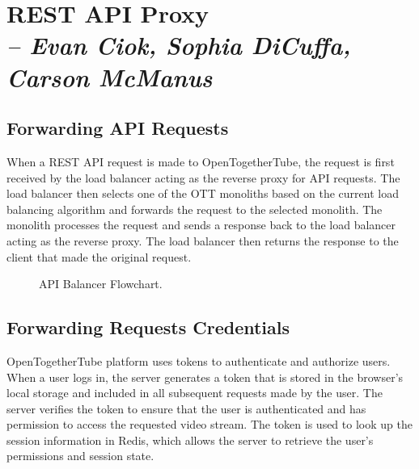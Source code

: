 \chapter{REST API Proxy \\
  \small{\textit{-- Evan Ciok, Sophia DiCuffa, Carson McManus}}
  \label{Chapter::RestApiProxy}}

\section{Forwarding API Requests}
When a REST API request is made to OpenTogetherTube, the request is first received by the load balancer
 acting as the reverse proxy for API requests. The load balancer then selects one of the OTT monoliths based
  on the current load balancing algorithm and forwards the request to the selected monolith. The monolith processes 
  the request and sends a response back to the load balancer acting as the reverse proxy. The load balancer then returns 
  the response to the client that made the original request.

\begin{figure}[!htb]
  \centering
  \caption{\label{Figure::api-balancer} API Balancer Flowchart.}
\end{figure}

\section{Forwarding Requests Credentials}

OpenTogetherTube platform uses tokens to authenticate and authorize users. When a user logs in, the
server generates a token that is stored in the browser's local storage and included in all subsequent requests made
by the user. The server verifies the token to ensure that the user is authenticated and has permission to access the
requested video stream. The token is used to look up the session information in Redis, which allows the server to 
retrieve the user's permissions and session state.